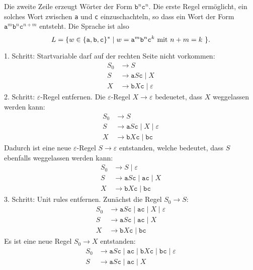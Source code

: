 \begin{loesung}
\begin{teilaufgaben}
\item
Die zweite Zeile erzeugt Wörter der Form $\texttt{b}^n\texttt{c}^n$.
Die erste Regel ermöglicht, ein solches Wort zwischen \texttt{a} und
\texttt{c} einzuschachteln, so dass ein Wort der Form
$\texttt{a}^m\texttt{b}^n\texttt{c}^{n+m}$ entsteht.
Die Sprache ist also
\[
L=\{
w\in\{\texttt{a},\texttt{b},\texttt{c}\}^*
\mid 
\text{$
w=
\texttt{a}^m \texttt{b}^n \texttt{c}^{k}$
mit
$n+m=k$
}
\}.
\]
\item
1. Schritt: Startvariable darf auf der rechten Seite nicht vorkommen:
\begin{align*}
S_0 & \to S
\\
S & \to \texttt{a} S \texttt{c} \mid  X
\\
X & \to \texttt{b}X\texttt{c} \mid  \varepsilon
\end{align*}
2. Schritt: $\varepsilon$-Regel entfernen.
Die $\varepsilon$-Regel $X\to\varepsilon$ bedeuetet, dass $X$ weggelassen
werden kann:
\begin{align*}
S_0 & \to S
\\
S & \to \texttt{a} S \texttt{c} \mid  X \mid  \varepsilon
\\
X & \to \texttt{b}X\texttt{c} \mid  \texttt{bc}
\end{align*}
Dadurch ist eine neue $\varepsilon$-Regel $S\to\varepsilon$ entstanden,
welche bedeutet, dass $S$ ebenfalls weggelassen werden kann:
\begin{align*}
S_0 & \to S \mid  \varepsilon
\\
S & \to
\texttt{a} S \texttt{c} \mid  \texttt{ac} \mid  X
\\
X & \to \texttt{b}X\texttt{c} \mid  \texttt{bc}
\end{align*}
3. Schritt: Unit rules entfernen.
Zunächst die Regel $S_0\to S$:
\begin{align*}
S_0 & \to
\texttt{a} S \texttt{c} \mid  \texttt{ac} \mid  X \mid  \varepsilon
\\
S & \to
\texttt{a} S \texttt{c} \mid  \texttt{ac} \mid  X
\\
X & \to \texttt{b}X\texttt{c} \mid  \texttt{bc}
\end{align*}
Es ist eine neue Regel $S_0\to X$ entstanden:
\begin{align*}
S_0 & \to
\texttt{a} S \texttt{c} \mid  \texttt{ac} \mid 
\texttt{b}X\texttt{c} \mid  \texttt{bc}
\mid  \varepsilon
\\
S & \to
\texttt{a} S \texttt{c} \mid  \texttt{ac} \mid  X

\end{align*}
\end{teilaufgaben}
\end{loesung}
